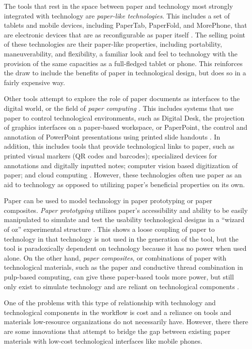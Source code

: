\documentclass{sig-alternate}
\begin{document}
The tools that rest in the space between paper and technology most strongly integrated with technology are \emph{paper-like technologies}. This includes a set of tablets and mobile devices, including PaperTab, PaperFold, and MorePhone, that are electronic devices that are as reconfigurable as paper itself \cite{gomes2014,gomes2013,tarun2013}. The selling point of these technologies are their paper-like properties, including portability, maneuverability, and flexibility, a familiar look and feel to technology with the provision of the same capacities as a full-fledged tablet or phone. This reinforces the draw to include the benefits of paper in technological design, but does so in a fairly expensive way.

Other tools attempt to explore the role of paper documents as interfaces to the digital world, or the field of \emph{paper computing} \cite{kaplan2010}. This includes systems that use paper to control technological environments, such as Digital Desk, the projection of graphics interfaces on a paper-based workspace, or PaperPoint, the control and annotation of PowerPoint presentations using printed slide handouts \cite{newman1992,wellner1993,signer2007}. In addition, this includes tools that provide technological links to paper, such as printed visual markers (QR codes and barcodes); specialized devices for annotations and digitally inputted notes; computer vision based digitization of paper; and cloud computing \cite{kaplan2010,anoto,pietrzak2010}. However, these technologies often use paper as an aid to technology as opposed to utilizing paper's beneficial properties on its own. 

Paper can be used to model technology in paper prototyping or paper composites. \emph{Paper prototyping} utilizes paper's accessibility and ability to be easily manipulated to simulate and test the usability technological designs in a ``wizard of oz'' experimental structure \cite{synder2001,chandler2002}. This shows a loose coupling of paper to technology in that technology is not used in the generation of the tool, but the tool is paradoxically dependent on technology because it has no power when used alone. On the other hand, \emph{paper composites}, or combinations of paper with technological materials, such as the paper and conductive thread combination in pulp-based computing, can give these paper-based tools more power, but still only exist to simulate technology and are reliant on technological components \cite{coelho2009}.

One of the problems with this type of relationship with technology and technological components in the workflow is cost and a reliance on tools and materials low-resource organizations do not necessarily have. However, there there are some innovations that attempt to bridge the gap between existing paper materials with low-cost technological interfaces like mobile phones.
\end{document}
